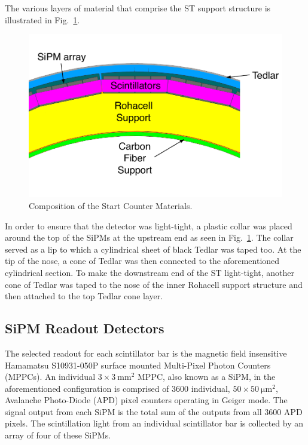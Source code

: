 The various layers of material that comprise the ST support structure is illustrated in Fig.~\ref{fig:stmaterials}.
	\begin{figure}
		\centering
		\includegraphics[width=1.0\columnwidth]{design/figs/st_materials}
		\caption{Composition of the Start Counter Materials.}
		\label{fig:stmaterials}
	\end{figure}
In order to ensure that the detector was light-tight, a plastic collar was placed around the top of the SiPMs at the upstream end as seen in Fig.~\ref{fig:stmaterials}.  The collar served as a lip to which a cylindrical sheet of black Tedlar was taped too.  At the tip of the nose, a cone of Tedlar was then connected to the aforementioned cylindrical section.  To make the downstream end of the ST light-tight, another cone of Tedlar was taped to the nose of the inner Rohacell support structure and then attached to the top Tedlar cone layer. 


\subsection{SiPM Readout Detectors} \label{sec:design_sipms}

The selected readout for each scintillator bar is the magnetic field insensitive Hamamatsu S10931-050P surface mounted Multi-Pixel Photon Counters (MPPCs)\cite{hamamatsu}.  An individual $\mathrm{3 \times 3\ mm^2}$ MPPC, also known as a SiPM, in the aforementioned configuration is comprised of 3600 individual, $\mathrm{50 \times 50\ \mu m^2}$, Avalanche Photo-Diode (APD) pixel counters operating in Geiger mode. The signal output from each SiPM is the total sum of the outputs from all 3600 APD pixels\cite{sipm_spec}.  The scintillation light from an individual scintillator bar is collected by an array of four of these SiPMs.

